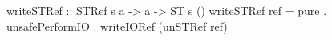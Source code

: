 \begin{code}
writeSTRef :: STRef s a -> a -> ST s ()
writeSTRef ref =
  pure . unsafePerformIO . writeIORef (unSTRef ref)
\end{code}
